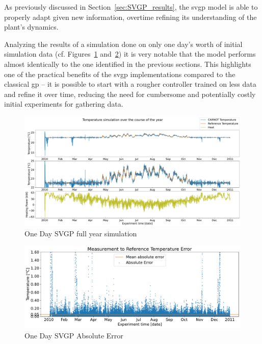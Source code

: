 As previously discussed in Section~\ref{sec:SVGP_results}, the \acrshort{svgp}
model is able to properly adapt given new information, overtime refining its
understanding of the plant's dynamics.

Analyzing the results of a simulation done on only one day's worth of initial
simulation data (cf. Figures~\ref{fig:SVGP_96pts_fullyear_simulation}
and~\ref{fig:SVGP_96pts_abserr}) it is very notable that the model performs
almost identically to the one identified in the previous sections. This
highlights one of the practical benefits of the \acrshort{svgp} implementations
compared to the classical \acrshort{gp} -- it is possible to start with a rougher
controller trained on less data and refine it over time, reducing the need for
cumbersome and potentially costly initial experiments for gathering data.

\begin{figure}[ht]
    \centering
    \includegraphics[width =
    \textwidth]{Plots/6_SVGP_96pts_inf_window_12_averageYear_fullyear.pdf}
    \caption{One Day SVGP full year simulation}
    \label{fig:SVGP_96pts_fullyear_simulation}
\end{figure}

\begin{figure}[ht]
    \centering
    \includegraphics[width =
    \textwidth]{Plots/6_SVGP_96pts_inf_window_12_averageYear_abserr.pdf}
    \caption{One Day SVGP Absolute Error}
    \label{fig:SVGP_96pts_abserr}
\end{figure}

